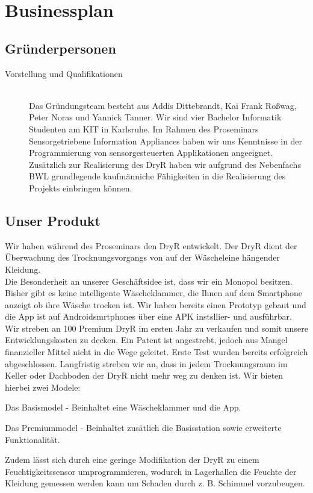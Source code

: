 \section{Businessplan}
\subsection{Gründerpersonen}
	\begin{description}
	\item [Vorstellung und Qualifikationen] \hfill \\
		Das Gründungsteam besteht aus Addis Dittebrandt, Kai Frank Roßwag, Peter Noras und Yannick Tanner.
			Wir sind vier Bachelor Informatik Studenten am KIT in Karlsruhe. Im Rahmen des Proseminars Sensorgetriebene Information Appliances haben wir uns Kenntnisse in der Programmierung von sensorgesteuerten Applikationen angeeignet. Zusätzlich zur Realisierung des DryR haben wir aufgrund des Nebenfachs BWL grundlegende kaufmänniche Fähigkeiten in die Realisierung des Projekts einbringen können.
	\end{description}
\subsection{Unser Produkt}
	Wir haben während des Proseminars den DryR entwickelt. Der DryR dient der Überwachung des Trocknungsvorgangs von auf der Wäscheleine hängender Kleidung. \\

	Die Besonderheit an unserer Geschäftsidee ist, dass wir ein Monopol besitzen. Bisher gibt es keine intelligente Wäscheklammer, die Ihnen auf dem Smartphone anzeigt ob ihre Wäsche trocken ist. Wir haben bereits einen Prototyp gebaut und die App ist auf Androidsmrtphones über eine APK instsllier- und ausführbar. Wir streben an 100 Premium DryR im ersten Jahr zu verkaufen und somit unsere Entwicklungskosten zu decken. Ein Patent ist angestrebt, jedoch aus Mangel finanzieller Mittel nicht in die Wege geleitet. Erste Test wurden bereits erfolgreich abgeschlossen. Langfristig streben wir an, dass in jedem Trocknungsraum im Keller oder Dachboden der DryR nicht mehr weg zu denken ist. Wir bieten hierbei zwei Modele:

	Das Basismodel - Beinhaltet eine Wäscheklammer und die App.

	Das Premiummodel - Beinhaltet zusätlich die Basisstation sowie erweiterte Funktionalität.

	Zudem lässt sich durch eine geringe Modifikation der DryR zu einem Feuchtigkeitssensor umprogrammieren, wodurch in Lagerhallen die Feuchte der Kleidung gemessen werden kann um Schaden durch z. B. Schimmel vorzubeugen.

